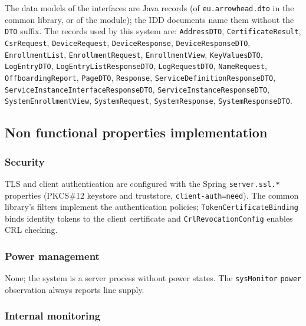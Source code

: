 \documentclass[a4paper]{arrowhead}
\begin{document}
The data models of the interfaces are Java records (of \texttt{eu.arrowhead.dto} in the common library, or of the module); the IDD documents name them without the \texttt{DTO} suffix. The records used by this system are: \texttt{AddressDTO}, \texttt{CertificateResult}, \texttt{CsrRequest}, \texttt{DeviceRequest}, \texttt{DeviceResponse}, \texttt{DeviceResponseDTO}, \texttt{EnrollmentList}, \texttt{EnrollmentRequest}, \texttt{EnrollmentView}, \texttt{KeyValuesDTO}, \texttt{LogEntryDTO}, \texttt{Log\allowbreak{}Entry\allowbreak{}List\allowbreak{}Response\allowbreak{}DTO}, \texttt{LogRequestDTO}, \texttt{NameRequest}, \texttt{OffboardingReport}, \texttt{PageDTO}, \texttt{Response}, \texttt{Service\allowbreak{}Definition\allowbreak{}Response\allowbreak{}DTO}, \texttt{Service\allowbreak{}Instance\allowbreak{}Interface\allowbreak{}Response\allowbreak{}DTO}, \texttt{Service\allowbreak{}Instance\allowbreak{}Response\allowbreak{}DTO}, \texttt{System\allowbreak{}Enrollment\allowbreak{}View}, \texttt{SystemRequest}, \texttt{SystemResponse}, \texttt{SystemResponseDTO}.

\subsection{Non functional properties implementation}

\subsubsection{Security}

TLS and client authentication are configured with the Spring \texttt{server.\allowbreak{}ssl.\allowbreak{}*} properties (PKCS\#12 keystore and truststore, \texttt{client-\allowbreak{}auth=\allowbreak{}need}). The common library's filters implement the authentication policies; \texttt{Token\allowbreak{}Certificate\allowbreak{}Binding} binds identity tokens to the client certificate and \texttt{Crl\allowbreak{}Revocation\allowbreak{}Config} enables CRL checking.

\subsubsection{Power management}

None; the system is a server process without power states. The \texttt{sysMonitor} \texttt{power} observation always reports line supply.

\subsubsection{Internal monitoring}
\end{document}
